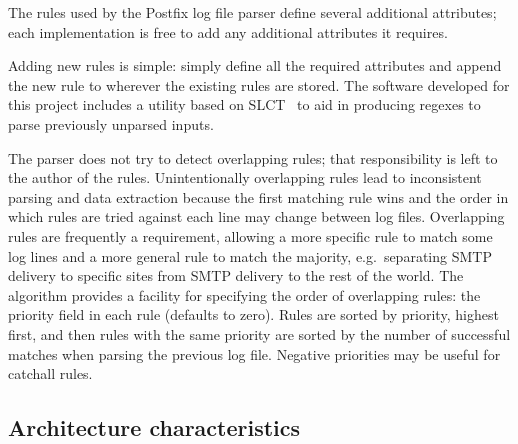 \documentclass[draft]{svmult}
\begin{document}
The rules used by the Postfix log file parser define several additional
attributes; each implementation is free to add any additional attributes it
requires.

Adding new rules is simple: simply define all the required attributes and
append the new rule to wherever the existing rules are stored.  The
software developed for this project includes a utility based on
SLCT~\cite{slct-paper} to aid in producing regexes to parse previously
unparsed inputs.

\label{overlapping rules}


The parser does not try to detect overlapping rules; that responsibility is
left to the author of the rules.  Unintentionally overlapping rules lead to
inconsistent parsing and data extraction because the first matching rule
wins and the order in which rules are tried against each line may change
between log files.  Overlapping rules are frequently a requirement,
allowing a more specific rule to match some log lines and a more general
rule to match the majority, e.g.\ separating SMTP delivery to specific
sites from SMTP delivery to the rest of the world.  The algorithm provides
a facility for specifying the order of overlapping rules: the priority
field in each rule (defaults to zero).  Rules are sorted by priority,
highest first, and then rules with the same priority are sorted by the
number of successful matches when parsing the previous log file.  Negative
priorities may be useful for catchall rules.



\subsection{Architecture characteristics}

\label{Architecture characteristics}
\end{document}
